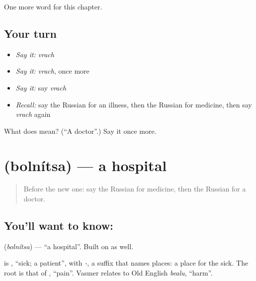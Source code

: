 \begin{grammarlens}[title={What you've built}]
One more word for this chapter.
\end{grammarlens}

\subsection*{Your turn}
\begin{itemize}
\raggedright
  \item \emph{Say it:} \emph{vrach}
  \item \emph{Say it:} \emph{vrach}, once more
  \item \emph{Say it:} say \emph{vrach}
  \item \emph{Recall:} say the Russian for an illness, then the Russian for medicine, then say \emph{vrach} again
\end{itemize}

\begin{tcolorbox}[breakable,colback=teal!4,colframe=teal!35!black,title={Before you move on}]
What does  mean? (\textquotedblleft{}A doctor\textquotedblright{}.) Say it once more.
\end{tcolorbox}
\section[\texorpdfstring{\ru{больница} (bolnítsa)}{больница (bolnítsa)}]{ (bolnítsa) — a hospital}

\label{lesson:RU-C32-hospital}



\begin{quote}
Before the new one: say the Russian for medicine, then the Russian for a doctor.
\end{quote}

\subsection*{You'll want to know: }
\textbf{} (\emph{bolnítsa}) — \textquotedblleft{}a hospital\textquotedblright{}. Built on \textbf{} as well.

\begin{cousinweb}
\textbf{} is \emph{}, \textquotedblleft{}sick; a patient\textquotedblright{}, with \emph{-}, a suffix that names places: a place for the sick. The root is that of \emph{}, \textquotedblleft{}pain\textquotedblright{}. Vasmer relates \emph{} to Old English \emph{bealu}, \textquotedblleft{}harm\textquotedblright{}.
\end{cousinweb}

